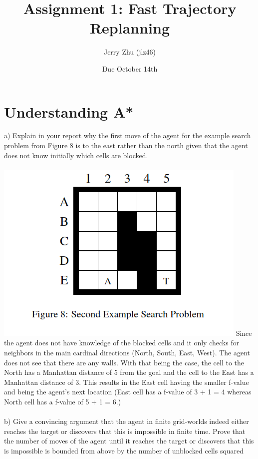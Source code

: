 \documentclass{article}
\title{Assignment 1: Fast Trajectory Replanning}
\author{Jerry Zhu (jlz46)}
\date{Due October 14th}
\begin{document}
\begin{titlepage}
\maketitle
\end{titlepage}

\section{Understanding A*}
a) Explain in your report why the first move of the agent for the example search problem from Figure 8 is to the east rather than the north given that the agent does not know initially which cells are blocked.\\\\
\includegraphics{Figure8.PNG}
Since the agent does not have knowledge of the blocked cells and it only checks for neighbors in the main cardinal directions (North, South, East, West). The agent does not see that there are any walls. With that being the case, the cell to the North has a Manhattan distance of 5 from the goal and the cell to the East has a Manhattan distance of 3. This results in the East cell having the smaller f-value and being the agent's next location (East cell has a f-value of 3 + 1 = 4 whereas North cell has a f-value of 5 + 1 = 6.)\\\\
b) Give a convincing argument that the agent in finite grid-worlds indeed either reaches the target or discovers that this is impossible in finite time. Prove that the number of moves of the agent until it reaches the target or discovers that this is impossible is bounded from above by the number of unblocked cells squared\\\\
\end{document}
